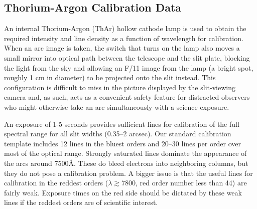 \documentclass[]{emulateapj}
\begin{document}
\subsection{Thorium-Argon Calibration Data}

An internal Thorium-Argon (ThAr) hollow cathode lamp is used to 
obtain the required intensity and
line density as a function of wavelength for calibration. When an arc
image is taken, the switch that turns on the lamp also moves a small
mirror into optical path between the telescope and the slit plate,
blocking the light from the sky and allowing an F/11 image from the
lamp (a bright spot, roughly 1 cm in diameter) to be projected onto the
slit instead. This configuration is difficult to miss in the picture
displayed by the slit-viewing camera and, as such, acts 
as a convenient safety feature for
distracted observers who might otherwise take an arc simultaneously
with a science exposure.

An exposure of 1-5 seconds provides sufficient lines for calibration
of the full spectral range for all slit widths (0.35--2 arcsec).  Our
standard calibration template includes 12 lines in the bluest orders
and 20--30 lines per order over most of the optical range.  Strongly
saturated lines dominate the appearance of the arcs around
7500\AA. These do bleed electrons into neighboring columns, but
they do not pose a calibration problem.  A bigger issue is that the
useful lines for calibration in the reddest orders 
($\lambda \gtrsim 7800$, 
red order number less than 44) are fairly weak.  Exposure times on the
red side should be dictated by these weak lines if the reddest orders
are of scientific interest.
\end{document}
